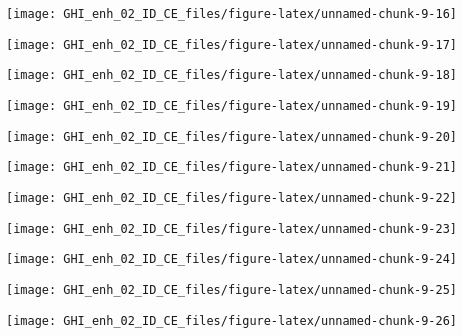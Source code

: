 \documentclass[
  10pt,
  a4paper,oneside]{article}
\begin{document}
\begin{center}\texttt{[image: GHI\_enh\_02\_ID\_CE\_files/figure-latex/unnamed-chunk-9-16]} \end{center}

\begin{center}\texttt{[image: GHI\_enh\_02\_ID\_CE\_files/figure-latex/unnamed-chunk-9-17]} \end{center}

\begin{center}\texttt{[image: GHI\_enh\_02\_ID\_CE\_files/figure-latex/unnamed-chunk-9-18]} \end{center}

\begin{center}\texttt{[image: GHI\_enh\_02\_ID\_CE\_files/figure-latex/unnamed-chunk-9-19]} \end{center}

\begin{center}\texttt{[image: GHI\_enh\_02\_ID\_CE\_files/figure-latex/unnamed-chunk-9-20]} \end{center}

\begin{center}\texttt{[image: GHI\_enh\_02\_ID\_CE\_files/figure-latex/unnamed-chunk-9-21]} \end{center}

\begin{center}\texttt{[image: GHI\_enh\_02\_ID\_CE\_files/figure-latex/unnamed-chunk-9-22]} \end{center}

\begin{center}\texttt{[image: GHI\_enh\_02\_ID\_CE\_files/figure-latex/unnamed-chunk-9-23]} \end{center}

\begin{center}\texttt{[image: GHI\_enh\_02\_ID\_CE\_files/figure-latex/unnamed-chunk-9-24]} \end{center}

\begin{center}\texttt{[image: GHI\_enh\_02\_ID\_CE\_files/figure-latex/unnamed-chunk-9-25]} \end{center}

\begin{center}\texttt{[image: GHI\_enh\_02\_ID\_CE\_files/figure-latex/unnamed-chunk-9-26]} \end{center}
\end{document}
